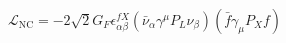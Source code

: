 \documentclass{standalone}
\begin{document}
$\mathcal{L}_{\mathrm{NC}} = -2 \sqrt{2} G_{F} \epsilon_{\alpha \beta}^{f X}\left(\bar{\nu}_{\alpha} \gamma^{\mu} P_{L} \nu_{\beta}\right)\left(\bar{f} \gamma_{\mu} P_{X} f\right)$
\end{document}
